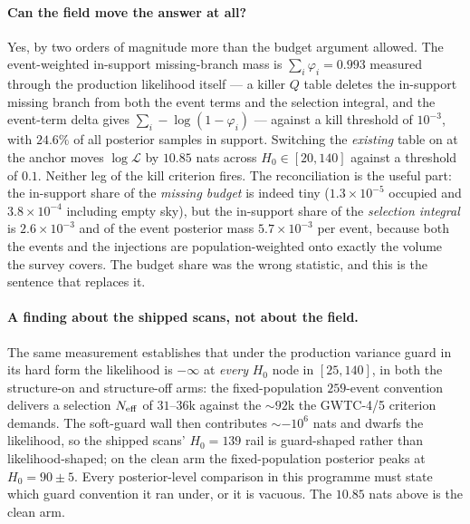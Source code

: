 \documentclass[11pt]{article}
\theoremstyle{definition}
\theoremstyle{remark}
\begin{document}
\paragraph{Can the field move the answer at all?} Yes, by two orders of
magnitude more than the budget argument allowed. The event-weighted in-support
missing-branch mass is $\sum_i\varphi_i=0.993$ measured through the production
likelihood itself --- a killer $Q$ table deletes the in-support missing branch
from both the event terms and the selection integral, and the event-term delta
gives $\sum_i-\log(1-\varphi_i)$ --- against a kill threshold of $10^{-3}$, with
$24.6\%$ of all posterior samples in support. Switching the \emph{existing} table
on at the anchor moves $\log\mathcal L$ by $10.85$ nats across
$H_0\in[20,140]$ against a threshold of $0.1$. Neither leg of the kill criterion
fires. The reconciliation is the useful part: the in-support share of the
\emph{missing budget} is indeed tiny ($1.3\times10^{-5}$ occupied and
$3.8\times10^{-4}$ including empty sky), but the in-support share of the
\emph{selection integral} is $2.6\times10^{-3}$ and of the event posterior mass
$5.7\times10^{-3}$ per event, because both the events and the injections are
population-weighted onto exactly the volume the survey covers. The budget share
was the wrong statistic, and this is the sentence that replaces it.

\paragraph{A finding about the shipped scans, not about the field.} The same
measurement establishes that under the production variance guard in its hard
form the likelihood is $-\infty$ at \emph{every} $H_0$ node in $[25,140]$, in
both the structure-on and structure-off arms: the fixed-population $259$-event
convention delivers a selection $N_{\rm eff}$ of $31$--$36$k against the
$\sim92$k the GWTC-4/5 criterion demands. The soft-guard wall then contributes
$\sim-10^6$ nats and dwarfs the likelihood, so the shipped scans' $H_0=139$ rail
is guard-shaped rather than likelihood-shaped; on the clean arm the
fixed-population posterior peaks at $H_0=90\pm5$. Every posterior-level
comparison in this programme must state which guard convention it ran under, or
it is vacuous. The $10.85$ nats above is the clean arm.
\end{document}
